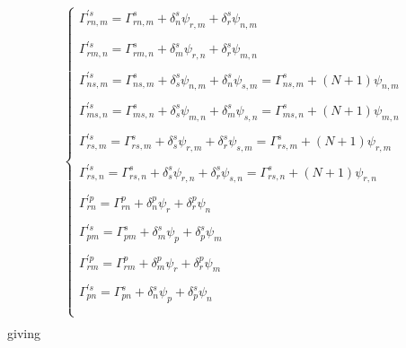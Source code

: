 \begin{align}
\left\{\begin{matrix}
\Gamma^{'s}_{rn,m} = \Gamma^{s}_{rn,m} +\delta^s_n\psi_{r,m} +\delta^s_r\psi_{n,m}\\\\
\Gamma^{'s}_{rm,n} = \Gamma^{s}_{rm,n} +\delta^s_m\psi_{r,n} +\delta^s_r\psi_{m,n}\\\\
\Gamma^{'s}_{ns,m} = \Gamma^{s}_{ns,m} +\delta^s_s\psi_{n,m} +\delta^s_n\psi_{s,m}= \Gamma^{s}_{ns,m} +\left(N+1\right)\psi_{n,m} \\\\
\Gamma^{'s}_{ms,n} = \Gamma^{s}_{ms,n} +\delta^s_s\psi_{m,n} +\delta^s_m\psi_{s,n}= \Gamma^{s}_{ms,n} +\left(N+1\right)\psi_{m,n} \\\\
\Gamma^{'s}_{rs,m} = \Gamma^{s}_{rs,m} +\delta^s_s\psi_{r,m} +\delta^s_r\psi_{s,m}= \Gamma^{s}_{rs,m} +\left(N+1\right)\psi_{r,m} \\\\
\Gamma^{'s}_{rs,n} = \Gamma^{s}_{rs,n} +\delta^s_s\psi_{r,n} +\delta^s_r\psi_{s,n}= \Gamma^{s}_{rs,n} +\left(N+1\right)\psi_{r,n} \\\\
\Gamma^{'p}_{rn} = \Gamma^{p}_{rn} +\delta^p_n\psi_r +\delta^p_r\psi_n\\\\
\Gamma^{'s}_{pm} = \Gamma^{s}_{pm} +\delta^s_m\psi_p +\delta^s_p\psi_m\\\\
\Gamma^{'p}_{rm} = \Gamma^{p}_{rm} +\delta^p_m\psi_r +\delta^p_r\psi_m\\\\
\Gamma^{'s}_{pn} = \Gamma^{s}_{pn} +\delta^s_n\psi_p +\delta^s_p\psi_n\\\\
\end{matrix}\right.\\
\end{align}
giving

